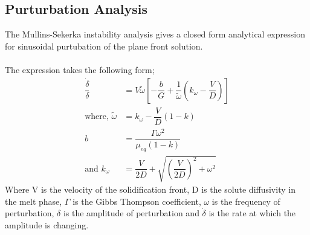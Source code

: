 \documentclass[12pt,a4paper]{report}
\begin{document}
	\subsection{Purturbation Analysis}
	The Mullins-Sekerka instability analysis gives a closed form
	analytical expression for sinusoidal purtubation of the plane
	front solution.\\
	\\
	The expression takes the following form;
	\begin{align*}
		\dfrac{\dot{\delta}}{\delta} &= V\tilde{\omega}\left[-\dfrac{b}{G} + \dfrac{1}{\tilde{\omega}}\left(k_{\omega} - \dfrac{V}{D}\right)\right]\\
		\text{where,  }
		\tilde{\omega} &= k_{\omega} - \dfrac{V}{D}(1-k)\\
		b &= \dfrac{\Gamma\omega^2}{\mu_{eq}(1-k)}\\
		\text{and   }
		k_{\omega} &= \dfrac{V}{2D} + \sqrt{\left(\dfrac{V}{2D}\right)^2 + \omega^2} 
	\end{align*}
	Where V is the velocity of the solidification front, D is 
	the solute diffusivity in the melt phase, $\Gamma$ is the 
	Gibbs Thompson coefficient, $\omega$ is the frequency of
	perturbation, $\delta$ is the amplitude of perturbation
	and $\dot{\delta}$ is the rate at which the amplitude is 
	changing.
	
	\begin{figure}[!htbp]
		\centering
		\hspace{.25in}
	\end{figure}
	
\end{document}
